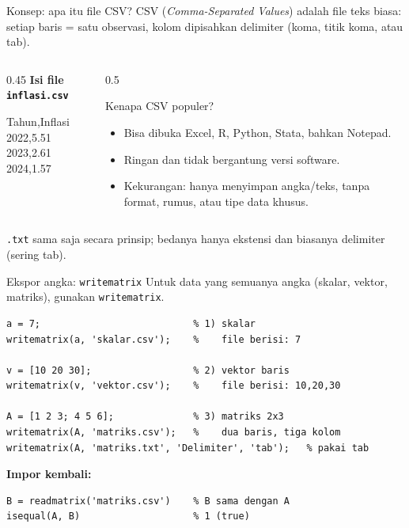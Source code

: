 \documentclass[10pt,aspectratio=169]{beamer}
\newcommand{\kode}[1]{\texttt{\small #1}}
\begin{document}
\begin{frame}{Konsep: apa itu file CSV?}
  CSV (\textit{Comma-Separated Values}) adalah \alert{file teks biasa}: setiap baris = satu observasi,
  kolom dipisahkan \alert{delimiter} (koma, titik koma, atau tab).
  \vspace{0.5em}
  \begin{columns}[T]
    \begin{column}{0.45\textwidth}
      \textbf{Isi file \kode{inflasi.csv}} \\[0.2em]
      \ttfamily\small
      \colorbox{kodebg}{\parbox{0.9\linewidth}{
      Tahun,Inflasi\\
      2022,5.51\\
      2023,2.61\\
      2024,1.57}}
    \end{column}
    \begin{column}{0.5\textwidth}
      \begin{block}{Kenapa CSV populer?}
        \small
        \begin{itemize}
          \item Bisa dibuka Excel, R, Python, Stata, bahkan Notepad.
          \item Ringan dan tidak bergantung versi software.
          \item Kekurangan: hanya menyimpan angka/teks, \alert{tanpa} format, rumus, atau tipe data khusus.
        \end{itemize}
      \end{block}
    \end{column}
  \end{columns}
  \vspace{0.4em}
  \small \kode{.txt} sama saja secara prinsip; bedanya hanya ekstensi dan biasanya delimiter (sering tab).
\end{frame}

\begin{frame}[fragile]{Ekspor angka: \kode{writematrix}}
  Untuk data yang \alert{semuanya angka} (skalar, vektor, matriks), gunakan \kode{writematrix}.
\begin{lstlisting}
a = 7;                           % 1) skalar
writematrix(a, 'skalar.csv');    %    file berisi: 7

v = [10 20 30];                  % 2) vektor baris
writematrix(v, 'vektor.csv');    %    file berisi: 10,20,30

A = [1 2 3; 4 5 6];              % 3) matriks 2x3
writematrix(A, 'matriks.csv');   %    dua baris, tiga kolom
writematrix(A, 'matriks.txt', 'Delimiter', 'tab');   % pakai tab
\end{lstlisting}
  \textbf{Impor kembali:}
\begin{lstlisting}
B = readmatrix('matriks.csv')    % B sama dengan A
isequal(A, B)                    % 1 (true)
\end{lstlisting}
\end{frame}
\end{document}
